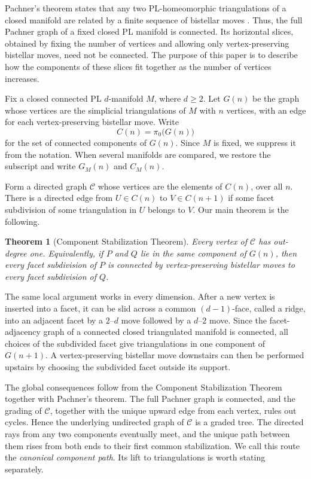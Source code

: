 \documentclass[11pt]{article}
\newtheorem*{theorem*}{Theorem}
\theoremstyle{remark}
\theoremstyle{plain}
\begin{document}
Pachner's theorem states that any two PL-homeomorphic triangulations of a
closed manifold are related by a finite sequence of bistellar moves
\cite{P91}.  Thus, the full Pachner graph of a fixed closed PL manifold is
connected.  Its horizontal slices, obtained by fixing the number of vertices
and allowing only vertex-preserving bistellar moves, need not be connected.
The purpose of this paper is to describe how the components of these slices
fit together as the number of vertices increases.

Fix a closed connected PL \(d\)-manifold \(M\), where \(d\ge2\).  Let
\(G(n)\) be the graph whose vertices are the simplicial triangulations of
\(M\) with \(n\) vertices, with an edge for each vertex-preserving bistellar
move.  Write
\[
 C(n)=\pi_0\bigl(G(n)\bigr)
\]
for the set of connected components of \(G(n)\).  Since \(M\) is fixed, we
suppress it from the notation.  When several manifolds are compared, we
restore the subscript and write \(G_M(n)\) and \(C_M(n)\).

Form a directed graph \(\mathcal C\) whose vertices are the elements of
\(C(n)\), over all \(n\).  There is a directed edge from \(U\in C(n)\) to
\(V\in C(n+1)\) if some facet subdivision of some triangulation in \(U\)
belongs to \(V\).  Our main theorem is the following.

\begin{theorem*}[Component Stabilization Theorem]
Every vertex of \(\mathcal C\) has out-degree one.  Equivalently, if \(P\)
and \(Q\) lie in the same component of \(G(n)\), then every facet subdivision
of \(P\) is connected by vertex-preserving bistellar moves to every facet
subdivision of \(Q\).
\end{theorem*}

The same local argument works in every dimension.  After a new vertex is
inserted into a facet, it can be slid across a common \((d-1)\)-face,
called a ridge, into an adjacent facet by a \(2\)--\(d\) move followed by a
\(d\)--\(2\) move.  Since the
facet-adjacency graph of a connected closed triangulated manifold is
connected, all choices of the subdivided facet give triangulations in one
component of \(G(n+1)\).  A vertex-preserving bistellar move downstairs can
then be performed upstairs by choosing the subdivided facet outside its
support.

The global consequences follow from the Component Stabilization Theorem
together with Pachner's theorem.  The full Pachner graph is connected, and
the grading of \(\mathcal C\), together with the unique upward edge from each
vertex, rules out cycles.  Hence the underlying undirected graph of
\(\mathcal C\) is a graded tree.  The directed rays from any two components
eventually meet, and the unique path between them rises from both ends to
their first common stabilization.  We call this route the \emph{canonical
component path}.  Its lift to triangulations is worth stating separately.
\end{document}
